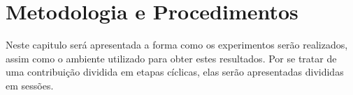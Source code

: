 \chapter{Metodologia e Procedimentos}

Neste capitulo será apresentada a forma como os experimentos serão realizados, assim como o ambiente  utilizado para obter estes resultados. Por se tratar de uma contribuição dividida em etapas cíclicas, elas serão apresentadas divididas em sessões.


